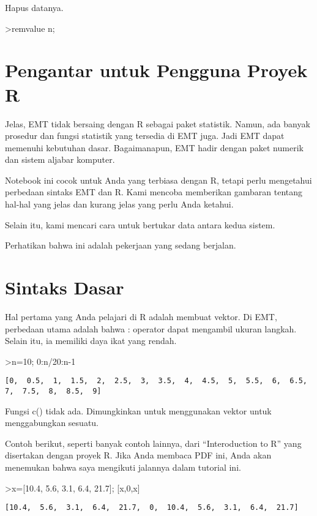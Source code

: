 \documentclass[
]{book}
\begin{document}
Hapus datanya.

\textgreater remvalue n;

\chapter{Pengantar untuk Pengguna Proyek R}\label{pengantar-untuk-pengguna-proyek-r}

Jelas, EMT tidak bersaing dengan R sebagai paket statistik. Namun, ada banyak prosedur dan fungsi statistik yang tersedia di EMT juga. Jadi EMT dapat memenuhi kebutuhan dasar. Bagaimanapun, EMT hadir dengan paket numerik dan sistem aljabar komputer.

Notebook ini cocok untuk Anda yang terbiasa dengan R, tetapi perlu mengetahui perbedaan sintaks EMT dan R. Kami mencoba memberikan gambaran tentang hal-hal yang jelas dan kurang jelas yang perlu Anda ketahui.

Selain itu, kami mencari cara untuk bertukar data antara kedua sistem.

Perhatikan bahwa ini adalah pekerjaan yang sedang berjalan.

\chapter{Sintaks Dasar}\label{sintaks-dasar}

Hal pertama yang Anda pelajari di R adalah membuat vektor. Di EMT, perbedaan utama adalah bahwa : operator dapat mengambil ukuran langkah. Selain itu, ia memiliki daya ikat yang rendah.

\textgreater n=10; 0:n/20:n-1

\begin{verbatim}
[0,  0.5,  1,  1.5,  2,  2.5,  3,  3.5,  4,  4.5,  5,  5.5,  6,  6.5,
7,  7.5,  8,  8.5,  9]
\end{verbatim}

Fungsi c() tidak ada. Dimungkinkan untuk menggunakan vektor untuk menggabungkan sesuatu.

Contoh berikut, seperti banyak contoh lainnya, dari ``Interoduction to R'' yang disertakan dengan proyek R. Jika Anda membaca PDF ini, Anda akan menemukan bahwa saya mengikuti jalannya dalam tutorial ini.

\textgreater x={[}10.4, 5.6, 3.1, 6.4, 21.7{]}; {[}x,0,x{]}

\begin{verbatim}
[10.4,  5.6,  3.1,  6.4,  21.7,  0,  10.4,  5.6,  3.1,  6.4,  21.7]
\end{verbatim}
\end{document}
